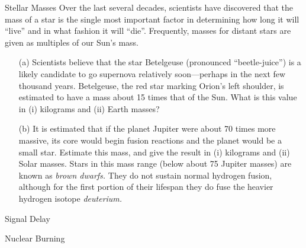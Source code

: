 \documentclass[12pt]{article}
\begin{document}
\begin{probdesc}{4}{Stellar Masses}
Over the last several decades, scientists have discovered that the
mass of a star is the single most important factor in determining how
long it will ``live'' and in what fashion it will ``die''.
Frequently, masses for distant stars are given as multiples of our
Sun's mass.

\begin{enumerate}
\item[(a)] Scientists believe that the star Betelgeuse (pronounced
  ``beetle-juice'') is a likely candidate to go supernova relatively
  soon---perhaps in the next few thousand years.  Betelgeuse, the red
  star marking Orion's left shoulder, is estimated to have a mass
  about 15 times that of the Sun.  What is this value in (i) kilograms
  and (ii) Earth masses?

\item[(b)] It is estimated that if the planet Jupiter were about 70
  times more massive, its core would begin fusion reactions and the
  planet would be a small star.  Estimate this mass, and give the
  result in (i) kilograms and (ii) Solar masses.  Stars in this mass
  range (below about 75 Jupiter masses) are known as {\em brown
  dwarfs.}  They do not sustain normal hydrogen fusion, although for
  the first portion of their lifespan they do fuse the heavier
  hydrogen isotope {\em deuterium.}
\end{enumerate}
\end{probdesc}

\begin{probdesc}{5}{Signal Delay}
\end{probdesc}

\begin{probdesc}{6}{Nuclear Burning}
\end{probdesc}
\end{document}
